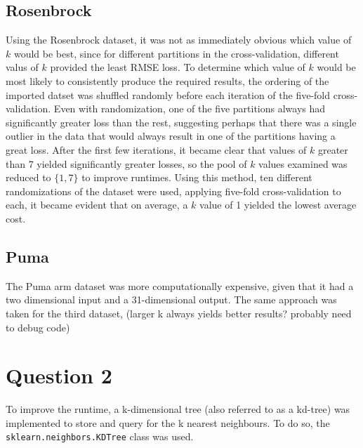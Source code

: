 \documentclass{article}
\begin{document}
\subsection{Rosenbrock}
Using the Rosenbrock dataset, it was not as immediately obvious which value of $k$ would be best, since for different partitions in the cross-validation, different valus of $k$ provided the least RMSE loss. To determine which value of $k$ would be most likely to consistently produce the required results, the ordering of the imported datset was shuffled randomly before each iteration of the five-fold cross-validation. Even with randomization, one of the five partitions always had significantly greater loss than the rest, suggesting perhaps that there was a single outlier in the data that would always result in one of the partitions having a great loss. After the first few iterations, it became clear that values of $k$ greater than 7 yielded significantly greater losses, so the pool of $k$ values examined was reduced to $\{1,7\}$ to improve runtimes. Using this method, ten different randomizations of the dataset were used, applying five-fold cross-validation to each, it became evident that on average, a $k$ value of 1 yielded the lowest average cost.

\subsection{Puma}
The Puma arm dataset was more computationally expensive, given that it had a two dimensional input and a 31-dimensional output. The same approach was taken for the third dataset, (larger k always yields better results? probably need to debug code)

\section{Question 2}
To improve the runtime, a k-dimensional tree (also referred to as a kd-tree) was implemented to store and query for the k nearest neighbours. To do so, the \texttt{sklearn.neighbors.KDTree} class was used. 
\end{document}
